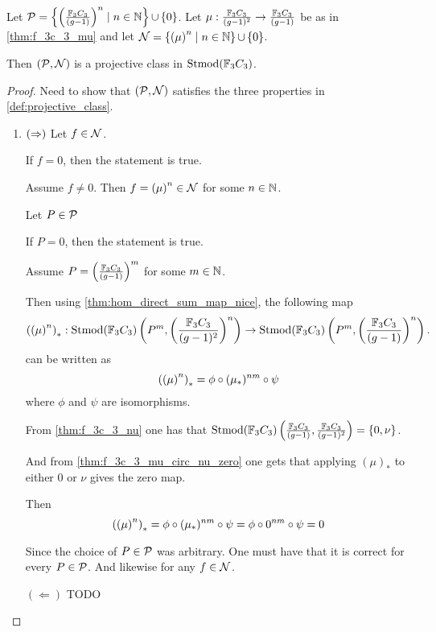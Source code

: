 \begin{theorem}
    Let \( {\mathcal{P}} = \left\{ \left( \frac{{\mathbb{F}}_3C_3}{(g - 1)} \right)^n \mid n \in {\mathbb{N}} \right\} \mathop{\cup}\limits \left\{ 0 \right\} \). Let \( \mu: \frac{{\mathbb{F}}_3C_3}{(g - 1)^2} \to \frac{{\mathbb{F}}_3C_3}{(g - 1)} \) be as in \autoref{thm:f_3c_3_mu} and let \( {\mathcal{N}} = \left\{ \left( \mu \right)^n \mid n \in {\mathbb{N}} \right\} \mathop{\cup}\limits \left\{ 0 \right\} \).

    Then \( \left( {\mathcal{P}}, {\mathcal{N}}\right) \) is a projective class in \( \operatorname{Stmod}({\mathbb{F}}_3C_3) \).
\end{theorem}
\begin{proof}
    Need to show that \( \left( {\mathcal{P}}, {\mathcal{N}} \right) \) satisfies the three properties in \autoref{def:projective_class}.

    \begin{enumerate}
        \item {
            \( \left( \Rightarrow \right) \) Let \( f \in {\mathcal{N}} \).

            If \( f = 0 \), then the statement is true.

            Assume \( f \neq 0 \). Then \( f = \left( \mu \right)^n \in {\mathcal{N}} \) for some \( n \in {\mathbb{N}} \).
            
            Let \( P \in {\mathcal{P}} \)
            
            If \( P = 0 \), then the statement is true.

            Assume \( P = \left( \frac{{\mathbb{F}}_3C_3}{(g - 1)} \right)^m \) for some \( m \in {\mathbb{N}} \).

            Then using \autoref{thm:hom_direct_sum_map_nice}, the following map
            \[
                \left( \left( \mu \right)^n \right)_* : \operatorname{Stmod}({\mathbb{F}}_3C_3)\left(P^m, \left(\frac{{\mathbb{F}}_3C_3}{(g - 1)^2}\right)^n \right) \to \operatorname{Stmod}({\mathbb{F}}_3C_3)\left(P^m, \left(\frac{{\mathbb{F}}_3C_3}{(g - 1)}\right)^n \right).
            \]
            can be written as
            \[
                \left( \left( \mu \right)^n \right)_* = \phi \circ (\mu_*)^{nm} \circ \psi
            \]
            where \( \phi \) and \( \psi \) are isomorphisms.

            From \autoref{thm:f_3c_3_nu} one has that \( \operatorname{Stmod}({\mathbb{F}}_3C_3)\left( \frac{{\mathbb{F}}_3C_3}{(g - 1)}, \frac{{\mathbb{F}}_3C_3}{(g - 1)^2} \right) = \left\{ 0, \nu \right\} \).

            And from \autoref{thm:f_3c_3_mu_circ_nu_zero} one gets that applying \( (\mu)_* \) to either \( 0 \) or \( \nu \) gives the zero map.

            Then
            \[
                \left( \left( \mu \right)^n \right)_* = \phi \circ (\mu_*)^{nm} \circ \psi = \phi \circ 0^{nm} \circ \psi = 0
            \]

            Since the choice of \( P \in {\mathcal{P}} \) was arbitrary. One must have that it is correct for every \( P \in {\mathcal{P}} \). And likewise for any \( f \in {\mathcal{N}} \).

            \( ( \Leftarrow ) \) TODO
        }
    \end{enumerate}
\end{proof}